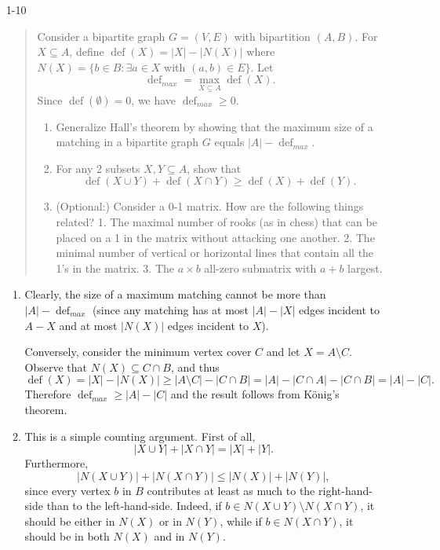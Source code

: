 \documentclass[12pt]{article}
\begin{document}
\begin{enumerate}
\item[1-10] %
\begin{quote}
Consider a bipartite graph $G=(V,E)$ with bipartition $(A,B)$. For
$X\subseteq A$, define $\operatorname{def}(X)=|X|-|N(X)|$ where $N(X)=\{b\in B:
\exists a\in X$ with $(a,b)\in E\}$. Let $$\operatorname{def}_{max}=
\max_{X\subseteq A} \operatorname{def}(X).$$ Since $\operatorname{def}(\emptyset)=0$, we have
$\operatorname{def}_{max}\geq 0$.
\begin{enumerate}
\item
Generalize Hall's theorem by showing that the maximum size of a
matching in a bipartite graph $G$ equals $|A|-\operatorname{def}_{max}$.
\item
For any 2 subsets $X, Y\subseteq A$, show that
$$\operatorname{def}(X\cup Y) + \operatorname{def}(X\cap Y) \geq \operatorname{def}(X) + \operatorname{def}(Y).$$
\item (Optional:) Consider a 0-1 matrix. How are the following things related? 1. The maximal number of rooks (as in chess) that can be placed on a 1 in the matrix without attacking one another. 2. The minimal number of vertical or horizontal lines that contain all the 1's in the matrix. 3. The $a\times b$ all-zero submatrix with $a + b$ largest.
\end{enumerate}
\end{quote}


\begin{enumerate}
\item
Clearly, the size of a maximum matching cannot be more than
$|A|-\operatorname{def}_{max}$ (since any matching has at
most $|A|-|X|$ edges incident to $A-X$ and at most $|N(X)|$ edges
incident to $X$).

Conversely, consider the minimum vertex cover $C$ and let
$X=A\setminus C$. Observe that $N(X)\subseteq C\cap B$, and thus
$$\operatorname{def}(X) =|X|-|N(X)|\geq |A\setminus C| - |C \cap B| =
|A| - |C \cap A|- |C\cap B|=|A|-|C|.$$  Therefore
$\operatorname{def}_{max}\geq |A|-|C|$ and the result follows from
K\"onig's theorem.
\item
This is a simple counting argument. First of all, $$|X\cup Y|+|X\cap
Y|=|X|+|Y|.$$ Furthermore, $$|N(X\cup Y)| + |N(X\cap Y)| \leq |N(X)| +
|N(Y)|,$$ since every vertex $b$ in $B$ contributes at least as much
to the right-hand-side than to the left-hand-side. Indeed, if $b\in
N(X\cup Y)\setminus N(X\cap Y)$, it should be either in $N(X)$ or in
$N(Y)$, while if $b\in N(X \cap Y)$, it should be in both $N(X)$ and in $N(Y)$.


\end{enumerate}
\end{enumerate}
\end{document}
